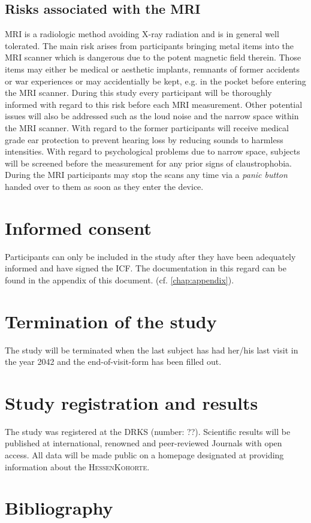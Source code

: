 
\subsection{Risks associated with the \ac{MRI}}
\ac{MRI} is a radiologic method avoiding X-ray radiation and is in general well tolerated. The main risk arises from participants bringing metal items into the \ac{MRI} scanner which is dangerous due to the potent magnetic field therein. Those items may either be medical or aesthetic implants, remnants of former accidents or war experiences or may accidentially be kept, e.g. in the pocket before entering the \ac{MRI} scanner. During this study every participant will be thoroughly informed with regard to this risk before each \ac{MRI}
measurement. Other potential issues will also be addressed such as the loud noise and the narrow space within the \ac{MRI} scanner. With regard to the former participants will receive medical grade ear protection to prevent hearing loss by reducing sounds to harmless intensities. With regard to psychological problems due to narrow space, subjects will be screened before the measurement for any prior signs of claustrophobia. During the \ac{MRI} participants may stop the scans any time via a \emph{panic button} handed over to them
as soon as they enter the device.

\section{Informed consent}
Participants can only be included in the study after they have been adequately informed and have signed the \ac{ICF}. The documentation in this regard can be found in the appendix of this document. (cf. \ref{chap:appendix}).

\section{Termination of the study}
The study will be terminated when the last subject has had her/his last visit in the year 2042 and the end-of-visit-form has been filled out.

\section{Study registration and results}
The study was registered at the \ac{DRKS} (number: ??). Scientific results will be published at international, renowned and peer-reviewed Journals with open access. All data will be made public on a homepage designated at providing information about the \textsc{HessenKohorte}.

\section{Bibliography}
